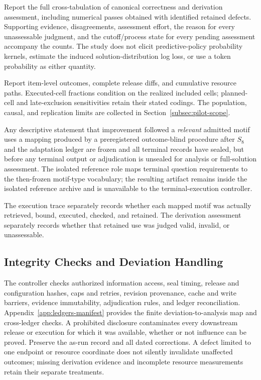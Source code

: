 \documentclass[10pt]{article} %
\providecommand{\1}{\mathbf{1}}  %
\theoremstyle{remark}
\theoremstyle{definition}
\begin{document}
Report the full cross-tabulation of canonical correctness and
derivation assessment, including numerical passes obtained with
identified retained defects. Supporting evidence, disagreements,
assessment effort, the reason for every unassessable judgment, and the
cutoff/process state for every pending assessment accompany the counts. The study does not elicit predictive-policy
probability kernels, estimate the induced solution-distribution log
loss, or use a token probability as either quantity.

Report item-level outcomes, complete release diffs, and cumulative resource
paths. Executed-cell fractions condition on the realized included cells;
planned-cell and late-exclusion sensitivities retain their stated codings.
The population, causal, and replication limits are collected in
Section~\ref{subsec:pilot-scope}.

Any descriptive statement that improvement followed a \emph{relevant}
admitted motif uses a mapping produced by a preregistered outcome-blind
procedure after $S_8$ and the adaptation ledger are frozen and all terminal
records have sealed, but before any terminal output or adjudication is
unsealed for analysis or full-solution assessment. The isolated reference
role maps terminal question requirements to the then-frozen motif-type
vocabulary; the resulting artifact remains inside the isolated reference
archive and is unavailable to the terminal-execution controller.

The execution trace separately records whether each mapped motif was
actually retrieved, bound, executed, checked, and retained. The derivation
assessment separately records whether that retained use was judged valid,
invalid, or unassessable.

\subsection{Integrity Checks and Deviation Handling}

\label{subsec:pilot-integrity}

The controller checks authorized information access, seal timing, release
and configuration hashes, caps and retries, revision provenance, cache and
write barriers, evidence immutability, adjudication rules, and ledger
reconciliation. Appendix~\ref{app:ledgers-manifest} provides the finite
deviation-to-analysis map and cross-ledger checks. A prohibited disclosure
contaminates every downstream release or execution for which it was available,
whether or not influence can be proved. Preserve the as-run record and all
dated corrections. A defect limited to one endpoint or resource coordinate
does not silently invalidate unaffected outcomes; missing derivation evidence
and incomplete resource measurements retain their separate treatments.
\end{document}
